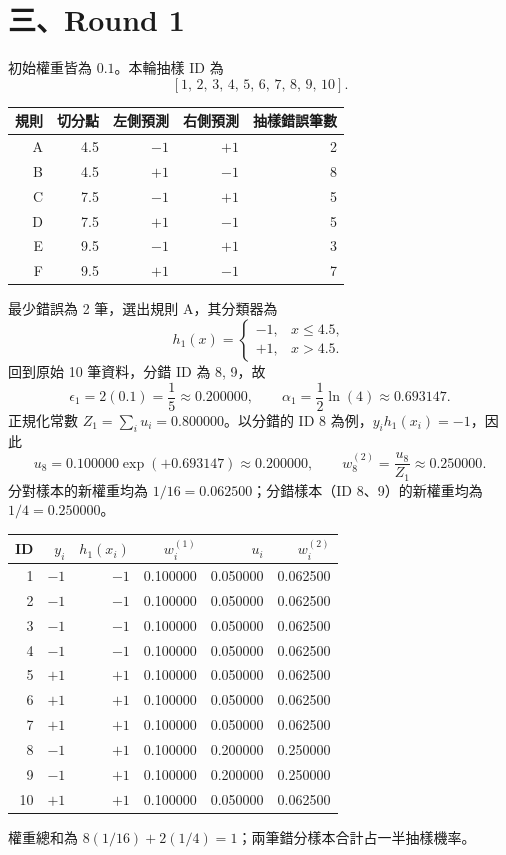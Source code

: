 \section*{三、Round 1}
初始權重皆為 $0.1$。本輪抽樣 ID 為 \[[1,\,2,\,3,\,4,\,5,\,6,\,7,\,8,\,9,\,10].\]
\begin{center}
\label{tab:round1}
\begin{tabular}{rrrrr}
\toprule
規則 & 切分點 & 左側預測 & 右側預測 & 抽樣錯誤筆數 \\
\midrule
A & 4.5 & $-1$ & $+1$ & 2 \\
B & 4.5 & $+1$ & $-1$ & 8 \\
C & 7.5 & $-1$ & $+1$ & 5 \\
D & 7.5 & $+1$ & $-1$ & 5 \\
E & 9.5 & $-1$ & $+1$ & 3 \\
F & 9.5 & $+1$ & $-1$ & 7 \\
\bottomrule
\end{tabular}
\end{center}
最少錯誤為 2 筆，選出規則 A，其分類器為
\[h_1(x)=\begin{cases}-1,&x\le 4.5,\\+1,&x>4.5.\end{cases}\]
回到原始 10 筆資料，分錯 ID 為 8, 9，故
\[\epsilon_1=2(0.1)=\frac15\approx 0.200000,\qquad \alpha_1=\frac12\ln\left(4\right)\approx 0.693147.\]
正規化常數 $Z_1=\sum_i u_i=0.800000$。以分錯的 ID 8 為例，$y_i h_1(x_i)=-1$，因此
\[u_{8}=0.100000\exp(+0.693147)\approx 0.200000,\qquad w_{8}^{(2)}=\frac{u_{8}}{Z_1}\approx 0.250000.\]
分對樣本的新權重均為 $1/16=0.062500$；分錯樣本（ID 8、9）的新權重均為 $1/4=0.250000$。
\begin{center}
\label{tab:weights1}
\begin{tabular}{rrrrrr}
\toprule
ID & $y_i$ & $h_1(x_i)$ & $w_i^{(1)}$ & $u_i$ & $w_i^{(2)}$ \\
\midrule
1 & $-1$ & $-1$ & 0.100000 & 0.050000 & 0.062500 \\
2 & $-1$ & $-1$ & 0.100000 & 0.050000 & 0.062500 \\
3 & $-1$ & $-1$ & 0.100000 & 0.050000 & 0.062500 \\
4 & $-1$ & $-1$ & 0.100000 & 0.050000 & 0.062500 \\
5 & $+1$ & $+1$ & 0.100000 & 0.050000 & 0.062500 \\
6 & $+1$ & $+1$ & 0.100000 & 0.050000 & 0.062500 \\
7 & $+1$ & $+1$ & 0.100000 & 0.050000 & 0.062500 \\
8 & $-1$ & $+1$ & 0.100000 & 0.200000 & 0.250000 \\
9 & $-1$ & $+1$ & 0.100000 & 0.200000 & 0.250000 \\
10 & $+1$ & $+1$ & 0.100000 & 0.050000 & 0.062500 \\
\bottomrule
\end{tabular}
\end{center}
權重總和為 $8(1/16)+2(1/4)=1$；兩筆錯分樣本合計占一半抽樣機率。
